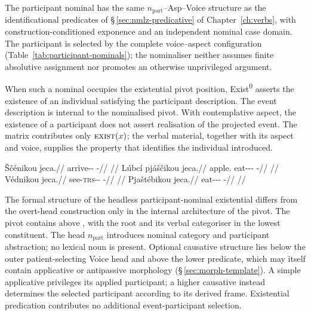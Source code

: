 The participant nominal has the same $n_{\mathrm{part}}$--Asp--Voice
structure as the identificational predicates of §\,\ref{sec:nmlz-predicative}
of Chapter~\ref{ch:verbs}, with construction-conditioned exponence and an
independent nominal case domain. The participant is selected by the complete
voice--aspect configuration (Table~\ref{tab:participant-nominals}); the
nominaliser neither assumes finite absolutive assignment nor promotes an
otherwise unprivileged argument.

\noindent When such a nominal occupies the existential pivot position,
Exist\textsuperscript{0} asserts the existence of an individual satisfying the
participant description. The event description is internal to the nominalised
pivot. With contemplative aspect, the existence of a participant does not
assert realisation of the projected event. The matrix 
contributes only $\textsc{exist}(x)$; the verbal material, together with its
aspect and voice, supplies the property that identifies the individual
introduced.

\pex
\a
\begingl
\gla Ščénikou jeca.//
\glb arrive-\Pf{}-\Nmlz{} \Exst{}-\Cont{}//
\glft {} //
\endgl
\a
\begingl
\gla Lúbcí pjáščikou jeca.//
\glb apple.\Ind{} eat-\Antip{}-\Pf{}-\Nmlz{} \Exst{}-\Cont{}//
\glft {} //
\endgl
\a
\begingl
\gla Védnikou jeca.//
\glb see-\textsc{trs}-\Pf{}-\Nmlz{} \Exst{}-\Cont{}//
\glft {} //
\endgl
\a
\begingl
\gla Pjaštébikou jeca.//
\glb eat-\Appl{}-\Pf{}-\Nmlz{} \Exst{}-\Cont{}//
\glft {} //
\endgl
\xe

The formal structure of the headless participant-nominal existential differs
from the overt-head construction only in the internal architecture of the pivot.
The pivot contains  above , with the root
and its verbal categoriser in the lowest constituent.
The head $n_{\mathrm{part}}$ introduces nominal category and participant
abstraction; no lexical noun is present. Optional causative structure lies
below the outer patient-selecting Voice head and above the lower predicate,
which may itself contain applicative or antipassive morphology
(§\,\ref{sec:morph-template}). A simple applicative privileges its applied
participant; a higher causative instead determines the selected participant
according to its derived frame. Existential predication contributes no
additional event-participant selection.

